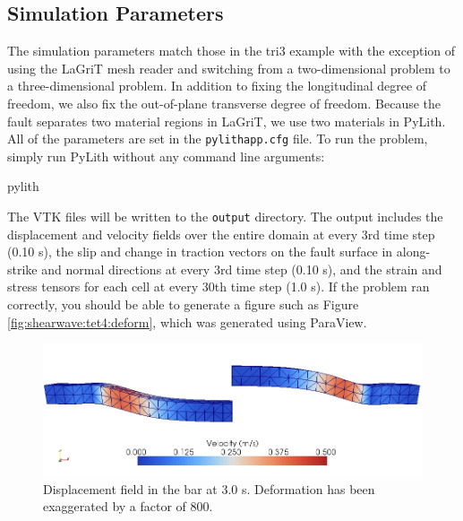 \subsection{Simulation Parameters}

The simulation parameters match those in the tri3 example with the
exception of using the LaGriT mesh reader and switching from a two-dimensional
problem to a three-dimensional problem. In addition to fixing the
longitudinal degree of freedom, we also fix the out-of-plane transverse
degree of freedom. Because the fault separates two material regions
in LaGriT, we use two materials in PyLith. All of the parameters are
set in the \texttt{pylithapp.cfg} file. To run the problem, simply
run PyLith without any command line arguments:
\begin{lyxcode}
pylith
\end{lyxcode}
The VTK files will be written to the \texttt{output} directory. The
output includes the displacement and velocity fields over the entire
domain at every 3rd time step (0.10 s), the slip and change in traction
vectors on the fault surface in along-strike and normal directions
at every 3rd time step (0.10 s), and the strain and stress tensors
for each cell at every 30th time step (1.0 s). If the problem ran
correctly, you should be able to generate a figure such as Figure
\vref{fig:shearwave:tet4:deform}, which was generated using ParaView.

\noindent \begin{center}
\begin{figure}
\begin{centering}
\includegraphics[scale=0.5]{tutorials/shearwave/figs/tet4deform30}
\par\end{centering}

\caption{Displacement field in the bar at 3.0 s. Deformation has been exaggerated
by a factor of 800.\label{fig:shearwave:tet4:deform}}
\end{figure}

\par\end{center}

